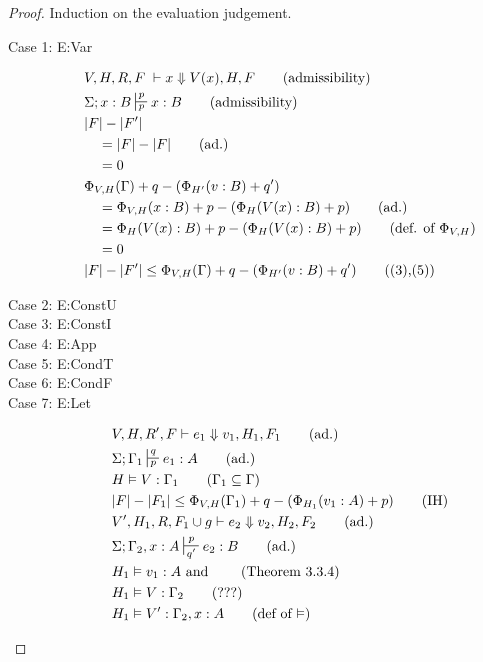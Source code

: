 \documentclass[11pt]{article}
\begin{document}
\begin{proof}
Induction on the evaluation judgement.\\
\begin{description}
   \item[Case 1: E:Var]
   \begin{align}
   &V,H,R,F \; \vdash x \Downarrow V(x),H,F \tag{admissibility}\\
   &\Sigma; x : B \sststile{p}{p} x : B \tag{admissibility}\\
   &|F| - |F'|\\
   &\quad = |F| - |F| \tag{ad.}\\
   &\quad = 0\\
   &\Phi_{V,H}(\Gamma) + q - (\Phi_{H'}(v:B) + q')\\
   &\quad = \Phi_{V,H}(x : B) + p - (\Phi_{H}(V(x) : B) + p) \tag{ad.}\\
   &\quad = \Phi_{H}(V(x) : B) + p  - (\Phi_{H}(V(x) : B) + p) \tag{def. of $\Phi_{V,H}$}\\
   &\quad = 0\\
   &|F| - |F'| \le \Phi_{V,H}(\Gamma) +q - (\Phi_{H'}(v:B) + q') \tag{(3),(5)}
   \end{align}
   \item[Case 2: E:ConstU]
   \item[Case 3: E:ConstI]
   \item[Case 4: E:App]
   \item[Case 5: E:CondT]
   \item[Case 6: E:CondF] 
   \item[Case 7: E:Let]
   \begin{align*}
   &V,H,R',F \vdash e_1 \Downarrow v_1,H_1,F_1 \tag{ad.}\\
   &\Sigma; \Gamma_1 \sststile{p}{q} e_1 : A \tag{ad.}\\
   &H \vDash V : \Gamma_1 \tag{$\Gamma_1 \subseteq \Gamma$}\\
   &|F| - |F_1| \le \Phi_{V,H}(\Gamma_1) +q - (\Phi_{H_1}(v_1:A) + p) \tag{IH}\\
   &V',H_1,R, F_1 \cup g \vdash e_2 \Downarrow v_2,H_2,F_2 \tag{ad.}\\
   &\Sigma; \Gamma_2, x : A \sststile{q'}{p} e_2 : B \tag{ad.}\\
   &H_1 \vDash v_1 : A \text{ and } \tag{Theorem 3.3.4}\\ 
   &H_1 \vDash V : \Gamma_2 \tag{???}\\
   &H_1 \vDash V' : \Gamma_2, x : A \tag{def of $\vDash$}\\

\end{align*}
\end{description}
\end{proof}
\end{document}
